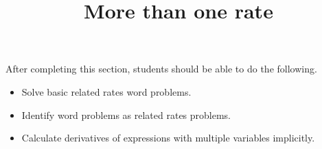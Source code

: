 \documentclass{ximera}
\title{More than one rate}
\begin{document}
\begin{abstract}
\end{abstract}

\maketitle

\begin{sectionOutcomes}

After completing this section, students should be able to do the following.

\begin{itemize}
	\item Solve basic related rates word problems.
	\item Identify word problems as related rates problems.
	\item Calculate derivatives of expressions with multiple variables implicitly.
\end{itemize}

\end{sectionOutcomes}
\end{document}
